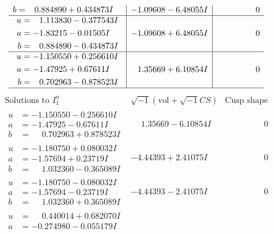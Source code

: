 \documentclass[1p]{elsarticle_modified}
\theoremstyle{definition}
\newcommand{\I}{\sqrt{-1}}
\begin{document}
$$\begin{array}{c|c|c}
\begin{aligned}
b &= \phantom{-}0.884890 + 0.434873 I\end{aligned}
 & -1.09608 - 6.48055 I & \phantom{-0.000000 } 0 \\ \hline\begin{aligned}
u &= \phantom{-}1.113830 - 0.377543 I \\
a &= -1.83215 - 0.01505 I \\
b &= \phantom{-}0.884890 - 0.434873 I\end{aligned}
 & -1.09608 + 6.48055 I & \phantom{-0.000000 } 0 \\ \hline\begin{aligned}
u &= -1.150550 + 0.256610 I \\
a &= -1.47925 + 0.67611 I \\
b &= \phantom{-}0.702963 - 0.878523 I\end{aligned}
 & \phantom{-}1.35669 + 6.10854 I & \phantom{-0.000000 } 0\\
 \hline 
 \end{array}$$\newpage$$\begin{array}{c|c|c}  
\text{Solutions to }I^u_{1}& \I (\text{vol} + \sqrt{-1}CS) & \text{Cusp shape}\\
 \hline 
\begin{aligned}
u &= -1.150550 - 0.256610 I \\
a &= -1.47925 - 0.67611 I \\
b &= \phantom{-}0.702963 + 0.878523 I\end{aligned}
 & \phantom{-}1.35669 - 6.10854 I & \phantom{-0.000000 } 0 \\ \hline\begin{aligned}
u &= -1.180750 + 0.080032 I \\
a &= -1.57694 + 0.23719 I \\
b &= \phantom{-}1.032360 - 0.365089 I\end{aligned}
 & -4.44393 + 2.41075 I & \phantom{-0.000000 } 0 \\ \hline\begin{aligned}
u &= -1.180750 - 0.080032 I \\
a &= -1.57694 - 0.23719 I \\
b &= \phantom{-}1.032360 + 0.365089 I\end{aligned}
 & -4.44393 - 2.41075 I & \phantom{-0.000000 } 0 \\ \hline\begin{aligned}
u &= \phantom{-}0.440014 + 0.682070 I \\
a &= -0.274980 - 0.055179 I \\

\end{aligned}
\end{array}$$
\end{document}
